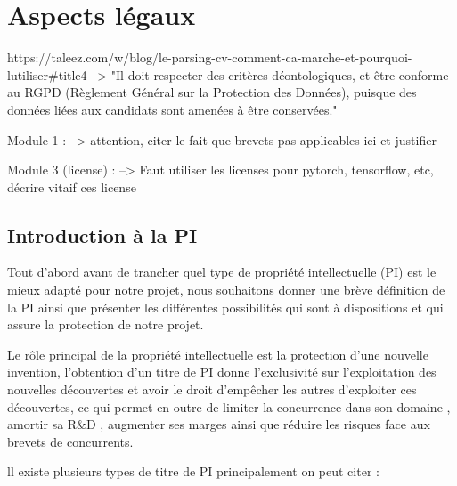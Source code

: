 \section{Aspects légaux}\label{section:aspects_legaux}

%
%


https://taleez.com/w/blog/le-parsing-cv-comment-ca-marche-et-pourquoi-lutiliser#title4
--> "Il doit respecter des critères déontologiques, et être conforme au RGPD (Règlement Général sur la Protection des Données), puisque des données liées aux candidats sont amenées à être conservées."

Module 1 : 
--> attention, citer le fait que brevets pas applicables ici et justifier


Module 3 (license) : 
--> Faut utiliser les licenses pour pytorch, tensorflow, etc, décrire vitaif ces license

\subsection{Introduction à la PI}
Tout d’abord avant de trancher quel type de propriété intellectuelle (PI) est le mieux adapté pour notre projet, nous souhaitons donner  une brève définition de la PI ainsi que présenter les  différentes possibilités qui sont à dispositions et qui assure la protection de notre projet.

Le rôle principal de la propriété intellectuelle est la protection d’une nouvelle invention, l’obtention d’un titre de PI donne l’exclusivité sur l’exploitation des nouvelles  découvertes et avoir le droit d'empêcher les autres d'exploiter ces découvertes, ce qui permet en outre de  limiter la concurrence dans son domaine , amortir sa R&D , augmenter ses marges ainsi que réduire les risques face aux brevets de concurrents.

ll existe plusieurs  types de titre de PI principalement on peut citer :  

